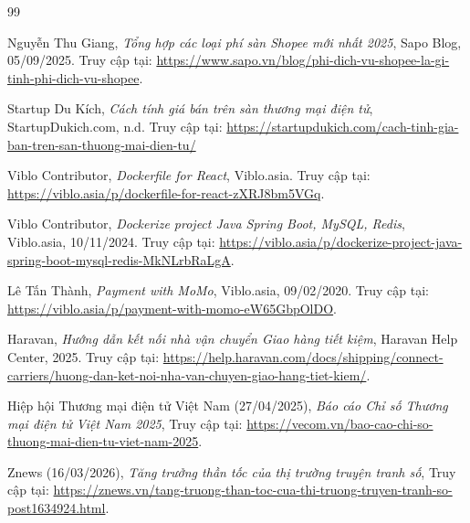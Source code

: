 \begin{thebibliography}{99}

 Nguyễn Thu Giang, 
\textit{Tổng hợp các loại phí sàn Shopee mới nhất 2025}, Sapo Blog, 05/09/2025. 
Truy cập tại: \url{https://www.sapo.vn/blog/phi-dich-vu-shopee-la-gi-tinh-phi-dich-vu-shopee}.

 Startup Du Kích, 
\textit{Cách tính giá bán trên sàn thương mại điện tử}, StartupDukich.com, n.d. 
Truy cập tại: \url{https://startupdukich.com/cach-tinh-gia-ban-tren-san-thuong-mai-dien-tu/}

 Viblo Contributor,
\textit{Dockerfile for React},
Viblo.asia.
Truy cập tại: \url{https://viblo.asia/p/dockerfile-for-react-zXRJ8bm5VGq}.

 Viblo Contributor,
\textit{Dockerize project Java Spring Boot, MySQL, Redis},
Viblo.asia, 10/11/2024.
Truy cập tại: \url{https://viblo.asia/p/dockerize-project-java-spring-boot-mysql-redis-MkNLrbRaLgA}.

 Lê Tấn Thành,
\textit{Payment with MoMo},
Viblo.asia, 09/02/2020.
Truy cập tại: \url{https://viblo.asia/p/payment-with-momo-eW65GbpOlDO}.

 Haravan,
\textit{Hướng dẫn kết nối nhà vận chuyển Giao hàng tiết kiệm},
Haravan Help Center, 2025.
Truy cập tại: \url{https://help.haravan.com/docs/shipping/connect-carriers/huong-dan-ket-noi-nha-van-chuyen-giao-hang-tiet-kiem/}.



 Hiệp hội Thương mại điện tử Việt Nam (27/04/2025), 
\textit{Báo cáo Chỉ số Thương mại điện tử Việt Nam 2025}, 
Truy cập tại: \url{https://vecom.vn/bao-cao-chi-so-thuong-mai-dien-tu-viet-nam-2025}. 

 Znews (16/03/2026), 
\textit{Tăng trưởng thần tốc của thị trường truyện tranh số}, 
Truy cập tại: \url{https://znews.vn/tang-truong-than-toc-cua-thi-truong-truyen-tranh-so-post1634924.html}.

\end{thebibliography}

